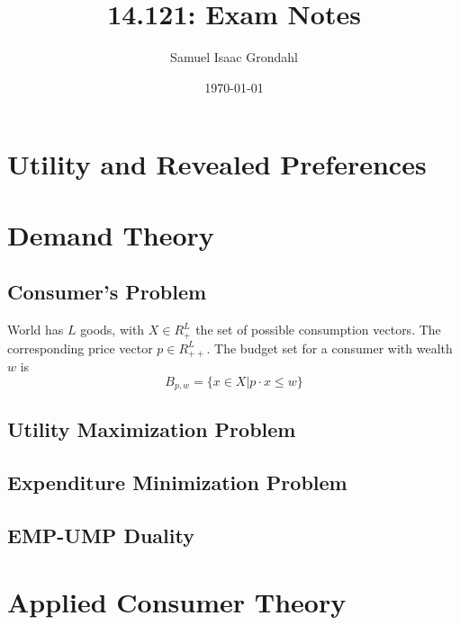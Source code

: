 \documentclass{article}
\begin{document}
\title{14.121: Exam Notes}
\date{\today}
\author{Samuel Isaac Grondahl}
\maketitle


\section{Utility and Revealed Preferences}
\label{sec:util-reve-pref}




\newpage
\section{Demand Theory}
\label{sec:demand-theory}

\subsection{Consumer's Problem}
\label{sec:consumers-problem}

World has $L$ goods, with $X \in R^L_+$ the set of possible
consumption vectors. The corresponding price vector $p \in
R^L_{++}$. The budget set for a consumer with wealth $w$ is 
\[
B_{p,w} = \{ x \in X | p \cdot x \leq w \}
\]

\subsection{Utility Maximization Problem}
\label{sec:util-maxim-probl}




\subsection{Expenditure Minimization Problem}
\label{sec:expend-minim-probl}



\subsection{EMP-UMP Duality}
\label{sec:emp-ump-duality}



\newpage

\section{Applied Consumer Theory}
\label{sec:appl-cons-theory}
\end{document}
